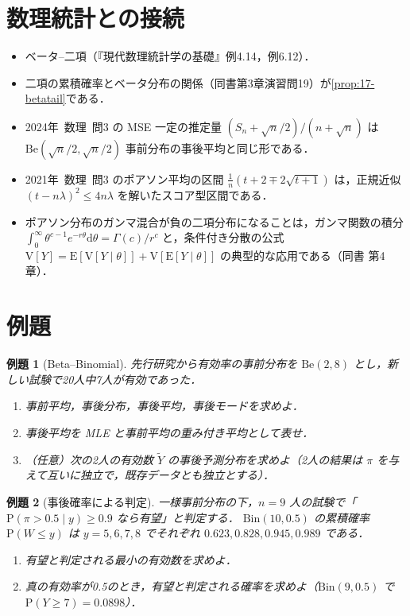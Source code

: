 \documentclass[a4paper,11pt,openany]{ltjsbook}
\newtheorem{reidai}{例題}[chapter]
\newcommand{\kakomonSM}[2]{\mbox{#1年 数理 問#2}}
\newcommand{\E}{\mathrm{E}}
\newcommand{\V}{\mathrm{V}}
\newcommand{\Prob}{\mathrm{P}}
\newcommand{\dd}{\mathrm{d}}
\newcommand{\Bin}{\mathrm{Bin}}
\newcommand{\Be}{\mathrm{Be}}
\begin{document}
\section{数理統計との接続}\label{sec:17-link}
\begin{linkbox}
\begin{itemize}
\item ベータ--二項（『現代数理統計学の基礎』例4.14，例6.12）．
\item 二項の累積確率とベータ分布の関係（同書第3章演習問19）が\cref{prop:17-betatail}である．
\item \kakomonSM{2024}{3} の MSE 一定の推定量 $(S_n+\sqrt n/2)/(n+\sqrt n)$ は $\Be(\sqrt n/2,\sqrt n/2)$ 事前分布の事後平均と同じ形である．
\item \kakomonSM{2021}{3} のポアソン平均の区間 $\frac1n(t+2\mp2\sqrt{t+1})$ は，正規近似 $(t-n\lambda)^2\le4n\lambda$ を解いたスコア型区間である．
\item ポアソン分布のガンマ混合が負の二項分布になることは，ガンマ関数の積分 $\int_0^\infty\theta^{c-1}e^{-r\theta}\dd\theta=\Gamma(c)/r^c$ と，条件付き分散の公式 $\V[Y]=\E[\V[Y\mid\theta]]+\V[\E[Y\mid\theta]]$ の典型的な応用である（同書 第4章）．
\end{itemize}
\end{linkbox}

\section{例題}\label{sec:17-ex}
\begin{reidai}[Beta--Binomial]\label{reidai:17-1}
先行研究から有効率の事前分布を $\Be(2,8)$ とし，新しい試験で20人中7人が有効であった．
\begin{enumerate}[label=(\arabic*)]
\item 事前平均，事後分布，事後平均，事後モードを求めよ．
\item 事後平均を MLE と事前平均の重み付き平均として表せ．
\item （任意）次の2人の有効数 $\tilde Y$ の事後予測分布を求めよ（2人の結果は $\pi$ を与えて互いに独立で，既存データとも独立とする）．
\end{enumerate}
\end{reidai}

\begin{reidai}[事後確率による判定]\label{reidai:17-2}
一様事前分布の下，$n=9$ 人の試験で「$\Prob(\pi>0.5\mid y)\ge0.9$ なら有望」と判定する．
$\Bin(10,0.5)$ の累積確率 $\Prob(W\le y)$ は $y=5,6,7,8$ でそれぞれ $0.623,0.828,0.945,0.989$ である．
\begin{enumerate}[label=(\arabic*)]
\item 有望と判定される最小の有効数を求めよ．
\item 真の有効率が0.5のとき，有望と判定される確率を求めよ（$\Bin(9,0.5)$ で $\Prob(Y\ge7)=0.0898$）．
\end{enumerate}
\end{reidai}
\end{document}
